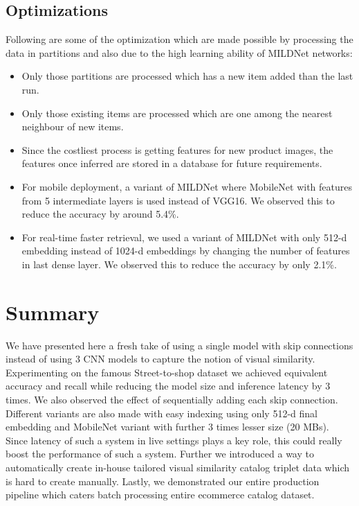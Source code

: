 \documentclass[10pt,twocolumn,letterpaper]{article}
\begin{document}
\subsection{Optimizations}
Following are some of the optimization which are made possible by processing the data in partitions and also due to the high learning ability of MILDNet networks:
\vspace{-2mm}
\begin{itemize}
\itemsep0em 
\item Only those partitions are processed which has a new item added than the last run. 
\item Only those existing items are processed which are one among the nearest neighbour of new items.
\item Since the costliest process is getting features for new product images, the features once inferred are stored in a database for future requirements.
\item For mobile deployment, a variant of MILDNet where MobileNet with features from 5 intermediate layers is used instead of VGG16. We observed this to reduce the accuracy by around 5.4\%.
\item For real-time faster retrieval, we used a variant of MILDNet with only 512-d embedding instead of 1024-d embeddings by changing the number of features in last dense layer. We observed this to reduce the accuracy by only 2.1\%.
\end{itemize}

\section{Summary}
We have presented here a fresh take of using a single model with skip connections instead of using 3 CNN models to capture the notion of visual similarity. Experimenting on the famous Street-to-shop dataset we achieved equivalent accuracy and recall while reducing the model size and inference latency by 3 times. We also observed the effect of sequentially adding each skip connection. Different variants are also made with easy indexing using only 512-d final embedding and MobileNet variant with further 3 times lesser size (20 MBs). Since latency of such a system in live settings plays a key role, this could really boost the performance of such a system. Further we introduced a way to automatically create in-house tailored visual similarity catalog triplet data which is hard to create manually. Lastly, we demonstrated our entire production pipeline which caters batch processing entire ecommerce catalog dataset.
\end{document}
